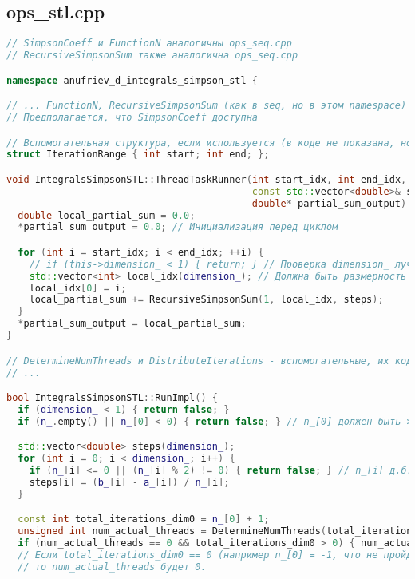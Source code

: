 \documentclass[a4paper,12pt]{article}
\begin{document}
\newpage
\subsection{ops\_stl.cpp}
\begin{lstlisting}[language=C++, caption=Ключевые функции из ops\_stl.cpp, basicstyle=\ttfamily\tiny]
// SimpsonCoeff и FunctionN аналогичны ops_seq.cpp
// RecursiveSimpsonSum также аналогична ops_seq.cpp

namespace anufriev_d_integrals_simpson_stl {

// ... FunctionN, RecursiveSimpsonSum (как в seq, но в этом namespace) ...
// Предполагается, что SimpsonCoeff доступна

// Вспомогательная структура, если используется (в коде не показана, но подразумевается DistributeIterations)
struct IterationRange { int start; int end; }; 

void IntegralsSimpsonSTL::ThreadTaskRunner(int start_idx, int end_idx, 
                                           const std::vector<double>& steps,
                                           double* partial_sum_output) {
  double local_partial_sum = 0.0;
  *partial_sum_output = 0.0; // Инициализация перед циклом

  for (int i = start_idx; i < end_idx; ++i) {
    // if (this->dimension_ < 1) { return; } // Проверка dimension_ лучше делать до вызова
    std::vector<int> local_idx(dimension_); // Должна быть размерность this->dimension_
    local_idx[0] = i;
    local_partial_sum += RecursiveSimpsonSum(1, local_idx, steps);
  }
  *partial_sum_output = local_partial_sum;
}

// DetermineNumThreads и DistributeIterations - вспомогательные, их код можно добавить при желании
// ...

bool IntegralsSimpsonSTL::RunImpl() {
  if (dimension_ < 1) { return false; }
  if (n_.empty() || n_[0] < 0) { return false; } // n_[0] должен быть >=0 и четным

  std::vector<double> steps(dimension_);
  for (int i = 0; i < dimension_; i++) {
    if (n_[i] <= 0 || (n_[i] % 2) != 0) { return false; } // n_[i] д.б. >0 и четным
    steps[i] = (b_[i] - a_[i]) / n_[i];
  }

  const int total_iterations_dim0 = n_[0] + 1;
  unsigned int num_actual_threads = DetermineNumThreads(total_iterations_dim0);
  if (num_actual_threads == 0 && total_iterations_dim0 > 0) { num_actual_threads = 1;}
  // Если total_iterations_dim0 == 0 (например n_[0] = -1, что не пройдет валидацию), 
  // то num_actual_threads будет 0.


\end{lstlisting}
\end{document}
